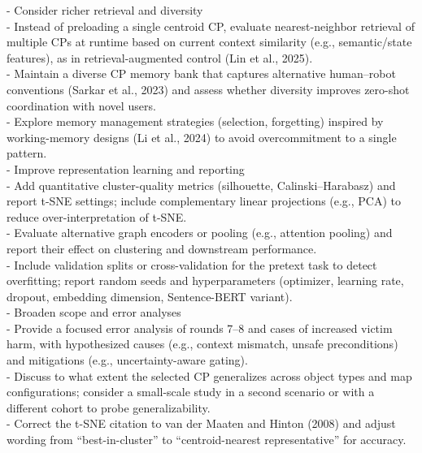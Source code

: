 \documentclass[letterpaper]{article} %
\begin{document}
- Consider richer retrieval and diversity\\
\hspace*{1em}- Instead of preloading a single centroid CP, evaluate nearest-neighbor retrieval of multiple CPs at runtime based on current context similarity (e.g., semantic/state features), as in retrieval-augmented control (Lin et al., 2025).\\
\hspace*{1em}- Maintain a diverse CP memory bank that captures alternative human–robot conventions (Sarkar et al., 2023) and assess whether diversity improves zero-shot coordination with novel users.\\
\hspace*{1em}- Explore memory management strategies (selection, forgetting) inspired by working-memory designs (Li et al., 2024) to avoid overcommitment to a single pattern.\\[0.25em]
- Improve representation learning and reporting\\
\hspace*{1em}- Add quantitative cluster-quality metrics (silhouette, Calinski–Harabasz) and report t-SNE settings; include complementary linear projections (e.g., PCA) to reduce over-interpretation of t-SNE.\\
\hspace*{1em}- Evaluate alternative graph encoders or pooling (e.g., attention pooling) and report their effect on clustering and downstream performance.\\
\hspace*{1em}- Include validation splits or cross-validation for the pretext task to detect overfitting; report random seeds and hyperparameters (optimizer, learning rate, dropout, embedding dimension, Sentence-BERT variant).\\[0.25em]
- Broaden scope and error analyses\\
\hspace*{1em}- Provide a focused error analysis of rounds 7–8 and cases of increased victim harm, with hypothesized causes (e.g., context mismatch, unsafe preconditions) and mitigations (e.g., uncertainty-aware gating).\\
\hspace*{1em}- Discuss to what extent the selected CP generalizes across object types and map configurations; consider a small-scale study in a second scenario or with a different cohort to probe generalizability.\\
\hspace*{1em}- Correct the t-SNE citation to van der Maaten and Hinton (2008) and adjust wording from “best-in-cluster” to “centroid-nearest representative” for accuracy.\\[0.25em]
\end{document}
